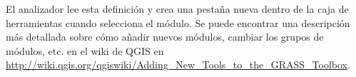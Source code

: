 El analizador lee esta definición y crea una pestaña nueva dentro de la caja de herramientas cuando selecciona el 
módulo. Se puede encontrar una descripción más detallada sobre cómo añadir nuevos módulos, cambiar los grupos de 
módulos, etc. en el wiki de QGIS en \\
\url{http://wiki.qgis.org/qgiswiki/Adding\_New\_Tools\_to\_the\_GRASS\_Toolbox}.

